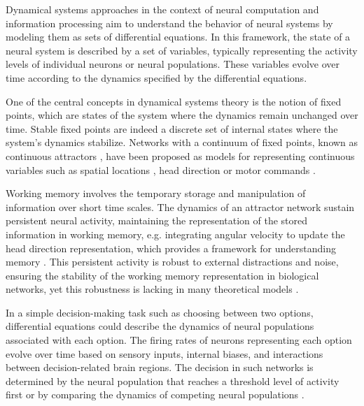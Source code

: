 \documentclass[12pt,letterpaper, onecolumn]{article}
\theoremstyle{definition}
\theoremstyle{remark}
\begin{document}
Dynamical systems approaches in the context of neural computation and information processing aim to understand the behavior of neural systems by modeling them as sets of differential equations. In this framework, the state of a neural system is described by a set of variables, typically representing the activity levels of individual neurons or neural populations. These variables evolve over time according to the dynamics specified by the differential equations. 

One of the central concepts in dynamical systems theory is the notion of fixed points, which are states of the system where the dynamics remain unchanged over time. Stable fixed points are indeed a discrete set of internal states where the system's dynamics stabilize. Networks with a continuum of fixed points, known as continuous attractors \citep{khona2022}, have been proposed as models for representing continuous variables such as spatial locations \citep{samsonovich1997, stringer2002placecells, yang2022, wimmer2014}, head direction \citep{stringer2002headdirection, hulse2020, turner2017, turner2020neuroanatomical, vafidis2022, kim2019generation} or motor commands \citep{stringer2003}.

Working memory involves the temporary storage and manipulation of information over short time scales. The dynamics of an attractor network sustain persistent neural activity, maintaining the representation of the stored information in working memory, e.g. integrating angular velocity to update the head direction representation, which provides a framework for understanding memory \citep{barak2014, wolpert1995, goncalves2014, burak2009, goldman2007, aksay2007, noorman2022}. This persistent activity is robust to external distractions and noise, ensuring the stability of the working memory representation \citep{panichello2019, koulakov2002} in biological networks, yet this robustness is lacking in many theoretical models \citep{renart2003, seeholzer2019}.

In a simple decision-making task such as choosing between two options, differential equations could describe the dynamics of neural populations associated with each option. The firing rates of neurons representing each option evolve over time based on sensory inputs, internal biases, and interactions between decision-related brain regions. The decision in such networks is determined by the neural population that reaches a threshold level of activity first or by comparing the dynamics of competing neural populations \citep{wong2007, wong2008}.
\end{document}
